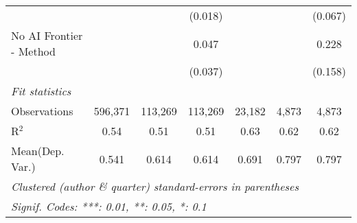 \begin{tabular}{lcccccc}
                           &               &               & (0.018)       &              &               & (0.067)\\   
   No AI Frontier - Method &               &               & 0.047         &              &               & 0.228\\   
                           &               &               & (0.037)       &              &               & (0.158)\\   
   \midrule
   \emph{Fit statistics}\\
   Observations            & 596,371       & 113,269       & 113,269       & 23,182       & 4,873         & 4,873\\  
   R$^2$                   & 0.54          & 0.51          & 0.51          & 0.63         & 0.62          & 0.62\\  
Mean(Dep. Var.) & 0.541 & 0.614 & 0.614 & 0.691 & 0.797 & 0.797 \\
   \midrule \midrule
   \multicolumn{7}{l}{\emph{Clustered (author \& quarter) standard-errors in parentheses}}\\
   \multicolumn{7}{l}{\emph{Signif. Codes: ***: 0.01, **: 0.05, *: 0.1}}\\
\end{tabular}
\par\endgroup
